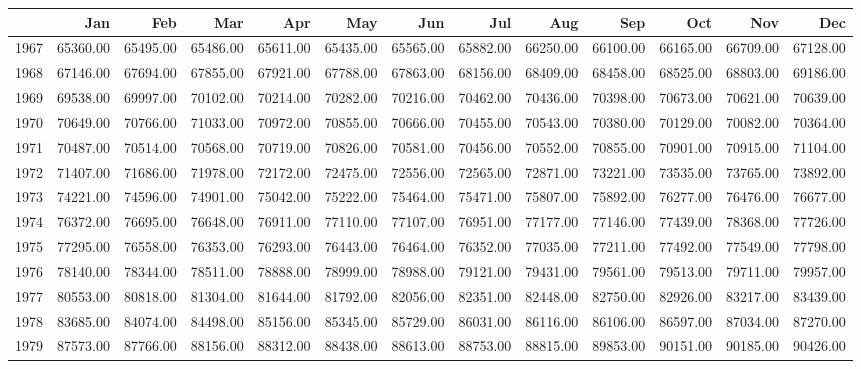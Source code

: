 \begin{longtable}{rrrrrrrrrrrrr}
  \hline
 & Jan & Feb & Mar & Apr & May & Jun & Jul & Aug & Sep & Oct & Nov & Dec \\ 
  \hline
1967 & 65360.00 & 65495.00 & 65486.00 & 65611.00 & 65435.00 & 65565.00 & 65882.00 & 66250.00 & 66100.00 & 66165.00 & 66709.00 & 67128.00 \\ 
  1968 & 67146.00 & 67694.00 & 67855.00 & 67921.00 & 67788.00 & 67863.00 & 68156.00 & 68409.00 & 68458.00 & 68525.00 & 68803.00 & 69186.00 \\ 
  1969 & 69538.00 & 69997.00 & 70102.00 & 70214.00 & 70282.00 & 70216.00 & 70462.00 & 70436.00 & 70398.00 & 70673.00 & 70621.00 & 70639.00 \\ 
  1970 & 70649.00 & 70766.00 & 71033.00 & 70972.00 & 70855.00 & 70666.00 & 70455.00 & 70543.00 & 70380.00 & 70129.00 & 70082.00 & 70364.00 \\ 
  1971 & 70487.00 & 70514.00 & 70568.00 & 70719.00 & 70826.00 & 70581.00 & 70456.00 & 70552.00 & 70855.00 & 70901.00 & 70915.00 & 71104.00 \\ 
  1972 & 71407.00 & 71686.00 & 71978.00 & 72172.00 & 72475.00 & 72556.00 & 72565.00 & 72871.00 & 73221.00 & 73535.00 & 73765.00 & 73892.00 \\ 
  1973 & 74221.00 & 74596.00 & 74901.00 & 75042.00 & 75222.00 & 75464.00 & 75471.00 & 75807.00 & 75892.00 & 76277.00 & 76476.00 & 76677.00 \\ 
  1974 & 76372.00 & 76695.00 & 76648.00 & 76911.00 & 77110.00 & 77107.00 & 76951.00 & 77177.00 & 77146.00 & 77439.00 & 78368.00 & 77726.00 \\ 
  1975 & 77295.00 & 76558.00 & 76353.00 & 76293.00 & 76443.00 & 76464.00 & 76352.00 & 77035.00 & 77211.00 & 77492.00 & 77549.00 & 77798.00 \\ 
  1976 & 78140.00 & 78344.00 & 78511.00 & 78888.00 & 78999.00 & 78988.00 & 79121.00 & 79431.00 & 79561.00 & 79513.00 & 79711.00 & 79957.00 \\ 
  1977 & 80553.00 & 80818.00 & 81304.00 & 81644.00 & 81792.00 & 82056.00 & 82351.00 & 82448.00 & 82750.00 & 82926.00 & 83217.00 & 83439.00 \\ 
  1978 & 83685.00 & 84074.00 & 84498.00 & 85156.00 & 85345.00 & 85729.00 & 86031.00 & 86116.00 & 86106.00 & 86597.00 & 87034.00 & 87270.00 \\ 
  1979 & 87573.00 & 87766.00 & 88156.00 & 88312.00 & 88438.00 & 88613.00 & 88753.00 & 88815.00 & 89853.00 & 90151.00 & 90185.00 & 90426.00 \\ 

\end{longtable}
